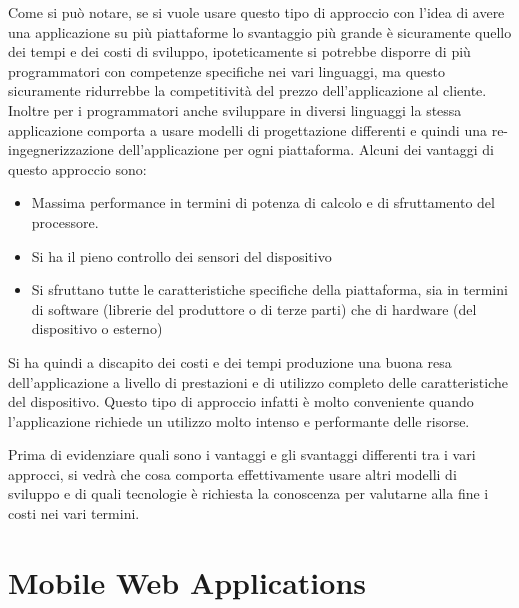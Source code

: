Come si può notare, se si  vuole usare questo tipo di approccio con l'idea di avere una applicazione su più piattaforme lo svantaggio più grande è sicuramente quello dei tempi e dei costi di sviluppo, ipoteticamente si potrebbe disporre di più programmatori con competenze specifiche nei vari linguaggi, ma questo sicuramente ridurrebbe la competitività del prezzo dell'applicazione al cliente. Inoltre per i programmatori anche sviluppare in diversi linguaggi la stessa applicazione comporta a usare modelli di progettazione differenti e quindi una re-ingegnerizzazione dell'applicazione per ogni piattaforma.
Alcuni dei vantaggi di questo approccio sono:

\begin{itemize}
\item Massima performance in termini di potenza di calcolo e di sfruttamento del processore.
\item Si ha il pieno controllo dei sensori del dispositivo
\item Si sfruttano tutte le caratteristiche specifiche della piattaforma, sia in termini di software (librerie del produttore o di terze parti) che di hardware (del dispositivo o esterno)
\end{itemize}

Si ha quindi a discapito dei costi e dei tempi produzione una buona resa dell'applicazione a livello di prestazioni e di utilizzo completo delle caratteristiche del dispositivo. Questo tipo di approccio infatti è molto conveniente quando l'applicazione richiede un utilizzo molto intenso e performante delle risorse.

Prima di evidenziare quali sono i vantaggi e gli svantaggi differenti tra i vari approcci, si vedrà che cosa comporta effettivamente usare altri modelli di sviluppo e di quali tecnologie è richiesta la conoscenza per valutarne alla fine i costi nei vari termini.  

\section{Mobile Web Applications}

